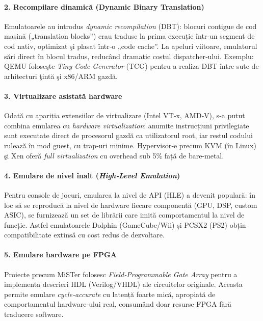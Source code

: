 \documentclass[titlepage,12pt]{article}
\DeclareRobustCommand{\code}[1]{{\ttfamily\small #1}}
\begin{document}
\paragraph{2. Recompilare dinamică (Dynamic Binary Translation)}
Emulatoarele au introdus \emph{dynamic recompilation} (DBT): blocuri contigue de cod mașină („translation blocks”) erau traduse la prima execuție într‑un segment de cod nativ, optimizat şi plasat într‑o „code cache”. La apeluri viitoare, emulatorul sări direct în blocul tradus, reducând dramatic costul dispatcher‑ului. Exemplu: QEMU foloseşte \emph{Tiny Code Generator} (TCG) pentru a realiza DBT între sute de arhitecturi ţintă şi x86/\-ARM gazdă.

\paragraph{3. Virtualizare asistată hardware}
Odată cu apariția extensiilor de virtualizare (Intel VT‑x, AMD‑V), s‑a putut combina emularea cu \emph{hardware virtualization}: anumite instrucțiuni privilegiate sunt executate direct de procesorul gazdă ca utilizatorul \code{root}, iar restul codului rulează în mod \code{guest}, cu trap‑uri minime. Hypervisor‑e precum KVM (în Linux) şi Xen oferă \emph{full virtualization} cu overhead sub 5\% față de bare‑metal.

\paragraph{4. Emulare de nivel înalt (\emph{High‑Level Emulation})}
Pentru console de jocuri, emularea la nivel de API (HLE) a devenit populară: în loc să se reproducă la nivel de hardware fiecare componentă (GPU, DSP, custom ASIC), se furnizează un set de librării care imită comportamentul la nivel de funcție. Astfel emulatoarele Dolphin (GameCube/Wii) și PCSX2 (PS2) obțin compatibilitate extinsă cu cost redus de dezvoltare.

\paragraph{5. Emulare hardware pe FPGA}
Proiecte precum MiSTer folosesc \emph{Field‑Programmable Gate Array} pentru a implementa descrieri HDL (Verilog/VHDL) ale circuitelor originale. Aceasta permite emulare \emph{cycle‑accurate} cu latență foarte mică, apropiată de comportamentul hardware‑ului real, consumând doar resurse FPGA fără traducere software.
\end{document}

